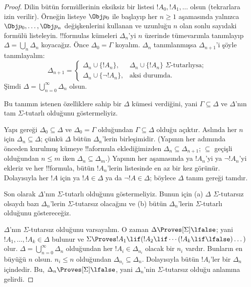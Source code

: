 \documentclass[../../../include/open-logic-section]{subfiles}
\begin{document}
\begin{proof}
Dilin bütün formüllerinin eksiksiz bir listesi $!A_0,!A_1,\dots$ olsun
(tekrarlara izin verilir). Örneğin listeye $\Obj p_0$ ile başlayıp her
$n\ge 1$ aşamasında yalnızca $\Obj p_0,\dots,\Obj p_n$ değişkenlerini
kullanan ve uzunluğu $n$ olan sonlu sayıdaki formülü listeleyin. !!{formula}s
kümeleri $\Delta_n$'yi $n$ üzerinde tümevarımla tanımlayıp
$\Delta=\bigcup_n\Delta_n$ koyacağız. Önce $\Delta_0=\Gamma$ koyalım.
$\Delta_n$ tanımlanmışsa $\Delta_{n+1}$'i şöyle tanımlayalım:
\[
\Delta_{n+1} =
\begin{cases}
  \Delta_n \cup \{!A_n\}, & \text{$\Delta_n \cup \{ !A_n\}$
    $\Sigma$-tutarlıysa;} \\
  \Delta_n \cup \{ \lnot !A_n\}, & \text{aksi durumda.}
\end{cases}
\]
Şimdi $\Delta=\bigcup_{n=0}^\infty\Delta_n$ olsun.

Bu tanımın istenen özelliklere sahip bir $\Delta$ kümesi verdiğini, yani
$\Gamma\subseteq\Delta$ ve $\Delta$'nın tam $\Sigma$-tutarlı olduğunu
göstermeliyiz.

Yapı gereği $\Delta_0\subseteq\Delta$ ve $\Delta_0=\Gamma$ olduğundan
$\Gamma\subseteq\Delta$ olduğu açıktır. Aslında her $n$ için
$\Delta_n\subseteq\Delta$; çünkü $\Delta$ bütün $\Delta_n$'lerin
birleşimidir. (Yapının her adımında önceden kurulmuş kümeye !!a{formula}
eklediğimizden $\Delta_n\subseteq\Delta_{n+1}$; $\subseteq$ geçişli
olduğundan $n\le m$ iken $\Delta_n\subseteq\Delta_m$.) Yapının her
aşamasında ya $!A_n$'yi ya $\lnot !A_n$'yi ekleriz ve her !!{formula}, bütün
$!A_n$'lerin listesinde en az bir kez görünür. Dolayısıyla her $!A$ için ya
$!A\in\Delta$ ya da $\lnot !A\in\Delta$; böylece $\Delta$ tanım gereği
tamdır.

Son olarak $\Delta$'nın $\Sigma$-tutarlı olduğunu göstermeliyiz. Bunun için
(a) $\Delta$ $\Sigma$-tutarsız olsaydı bazı $\Delta_n$'lerin
$\Sigma$-tutarsız olacağını ve (b) bütün $\Delta_n$'lerin
$\Sigma$-tutarlı olduğunu göstereceğiz.

$\Delta$'nın $\Sigma$-tutarsız olduğunu varsayalım. O zaman
$\Delta\Proves[\Sigma]\lfalse$; yani $!A_1,\dots,!A_k\in\Delta$ bulunur ve
$\Sigma\Proves !A_1\lif(!A_2\lif\cdots(!A_k\lif\lfalse)\dots)$ olur.
$\Delta=\bigcup_{n=0}^\infty\Delta_n$ olduğundan her
$!A_i\in\Delta_{n_i}$ olacak bir $n_i$ vardır. Bunların en büyüğü $n$ olsun.
$n_i\le n$ olduğundan $\Delta_{n_i}\subseteq\Delta_n$. Dolayısıyla bütün
$!A_i$'ler bir $\Delta_n$ içindedir. Bu, $\Delta_n\Proves[\Sigma]\lfalse$,
yani $\Delta_n$'nin $\Sigma$-tutarsız olduğu anlamına gelirdi.


\end{proof}
\end{document}
